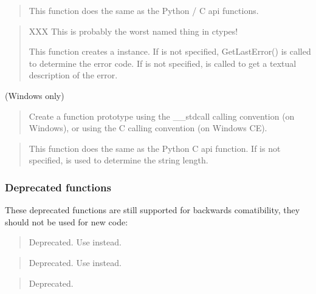 \begin{quote}

This function does the same as the Python  /
 C api functions.
\end{quote}

\begin{quote}

XXX This is probably the worst named thing in ctypes!

This function creates a  instance.  If  is
not specified, GetLastError() is called to determine the error
code.  If  is not specified,  is called to
get a textual description of the error.
\end{quote}

 (Windows only)
\begin{quote}

Create a function prototype using the {\_}{\_}stdcall calling convention
(on Windows), or using the C calling convention (on Windows CE).
\end{quote}

\begin{quote}

This function does the same as the Python 
C api function.  If  is not specified,  is used
to determine the string length.
\end{quote}


\subsubsection{Deprecated functions\label{ctypes-deprecated-functions}}

These deprecated functions are still supported for backwards
comatibility, they should not be used for new code:

\begin{quote}

Deprecated.  Use  instead.
\end{quote}

\begin{quote}

Deprecated.  Use  instead.
\end{quote}

\begin{quote}

Deprecated.
\end{quote}


